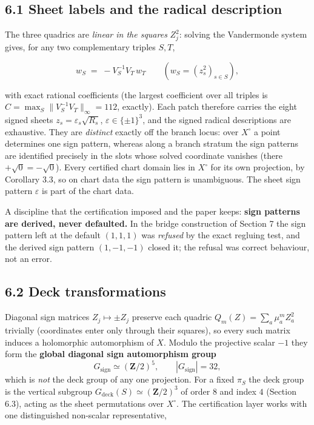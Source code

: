 \subsection{6.1 Sheet labels and the radical description}\label{sheet-labels-and-the-radical-description}

The three quadrics are \emph{linear in the squares} \(Z_j^2\): solving the Vandermonde system gives, for any two complementary triples \(S, T\),

\[w_S \;=\; -V_S^{-1} V_T\, w_T \qquad (w_S = (z_s^2)_{s \in S}),\]

with exact rational coefficients (the largest coefficient over all triples is \(C = \max_S \lVert V_S^{-1} V_T \rVert_\infty = 112\), exactly). Each patch therefore carries the eight signed sheets \(z_s = \varepsilon_s \sqrt{R_s}\), \(\varepsilon \in \{\pm 1\}^3\), and the signed radical descriptions are exhaustive. They are \emph{distinct} exactly off the branch locus: over \(X^\circ\) a point determines one sign pattern, whereas along a branch stratum the sign patterns are identified precisely in the slots whose solved coordinate vanishes (there \(+\sqrt{0} = -\sqrt{0}\)). Every certified chart domain lies in \(X^\circ\) for its own projection, by Corollary 3.3, so on chart data the sign pattern is unambiguous. The sheet sign pattern \(\varepsilon\) is part of the chart data.

A discipline that the certification imposed and the paper keeps: \textbf{sign patterns are derived, never defaulted.} In the bridge construction of Section 7 the sign pattern left at the default \((1,1,1)\) was \emph{refused} by the exact regluing test, and the derived sign pattern \((1,-1,-1)\) closed it; the refusal was correct behaviour, not an error.

\subsection{6.2 Deck transformations}\label{deck-transformations}

Diagonal sign matrices \(Z_j \mapsto \pm Z_j\) preserve each quadric \(Q_m(Z) = \sum_a \mu_a^m Z_a^2\) trivially (coordinates enter only through their squares), so every such matrix induces a holomorphic automorphism of \(X\). Modulo the projective scalar \(-1\) they form the \textbf{global diagonal sign automorphism group} \[G_{\mathrm{sign}} \simeq (\mathbf{Z}/2)^5, \qquad |G_{\mathrm{sign}}| = 32,\] which is \emph{not} the deck group of any one projection. For a fixed \(\pi_S\) the deck group is the vertical subgroup \(G_{\mathrm{deck}}(S) \simeq (\mathbf{Z}/2)^3\) of order \(8\) and index \(4\) (Section 6.3), acting as the sheet permutations over \(X^\circ\). The certification layer works with one distinguished non-scalar representative,

